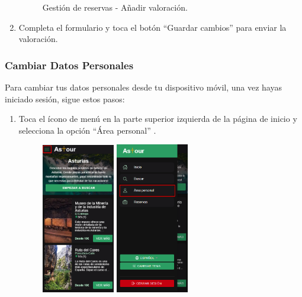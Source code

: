 \begin{enumerate}
\begin{figure}[H]
		      \caption{Gestión de reservas -  Añadir valoración.}
	      \end{figure}
	\item Completa el formulario y toca el botón “Guardar cambios” para enviar la valoración.
\end{enumerate}

\subsubsection{Cambiar Datos Personales}
Para cambiar tus datos personales desde tu dispositivo móvil, una vez hayas iniciado sesión, sigue estos pasos:
\begin{enumerate}
	\item Toca el ícono de menú en la parte superior izquierda de la página de inicio y selecciona la opción “Área personal” .
	      \begin{figure}[H]
		      \centering
		      \includegraphics[width=0.3\textwidth]{7-Construccion/Manuales/mobile/menu marcado.png}
		      \includegraphics[width=0.3\textwidth]{7-Construccion/Manuales/mobile/area personal marcado.png}

\end{figure}
\end{enumerate}
